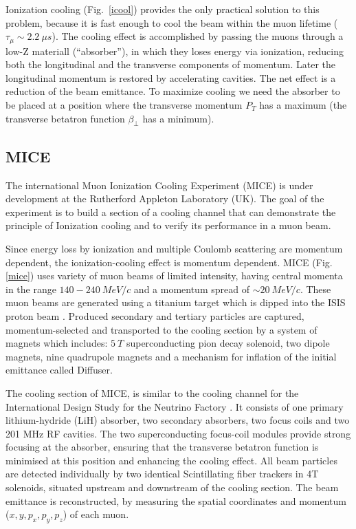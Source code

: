 \documentclass[a4paper,11pt]{article}
\begin{document}
Ionization cooling \cite{icool1} (Fig.\ \ref{icool}) provides the only practical solution to this problem,
because it is fast enough to cool the beam within the muon lifetime ($\tau_\mu \sim 2.2 \ \mu s$). The cooling effect is
accomplished by passing the muons through a low-Z materiall (\textquotedblleft absorber\textquotedblright), in which they
loses energy via ionization, reducing both the longitudinal and the transverse components of momentum. Later the longitudinal
momentum is restored by accelerating cavities. The net effect is a reduction of the beam emittance. To maximize cooling
we need the absorber to be placed at a position where the transverse momentum $P_T$
has a maximum (the transverse betatron function $\beta_{\perp}$ has a minimum).

\subsection{MICE}
The international Muon Ionization Cooling Experiment (MICE) \cite{MICEweb} is under development at the Rutherford Appleton
Laboratory (UK). The goal of the experiment is to build a section of a cooling channel that can demonstrate the principle
of Ionization cooling and to verify its performance in a muon beam. 

Since energy loss by ionization and multiple Coulomb scattering are momentum dependent, the ionization-cooling effect is
momentum dependent. MICE (Fig. \ref{mice}) uses variety of muon beams of limited intensity, having central momenta in the
range $140 - 240 \ MeV/c$ and a momentum spread of $\sim 20 \ MeV/c$. These muon beams are generated using a titanium target
\cite{target} which is dipped into the ISIS proton beam \cite{isis}. Produced secondary and tertiary particles are captured,
momentum-selected and transported to the cooling section by a system of magnets which includes: $5\ T$ superconducting pion
decay solenoid, two dipole magnets, nine quadrupole magnets and a mechanism for inflation of the initial emittance called Diffuser.

The cooling section of MICE, is similar to the cooling channel for the International Design Study
for the Neutrino Factory \cite{ids-nf}. It consists of one primary lithium-hydride (LiH) absorber, two secondary absorbers,
two focus coils and two 201 MHz RF cavities. The two superconducting focus-coil modules provide strong focusing at the
absorber, ensuring that the transverse betatron function is minimised at this position and enhancing the cooling effect. 
All beam particles are detected individually by two identical Scintillating fiber trackers in 4T
solenoids, situated upstream and downstream of the cooling section. The beam emittance is reconstructed, by measuring the
spatial coordinates and momentum ($x,y,p_x,p_y,p_z$) of each muon.
\end{document}
